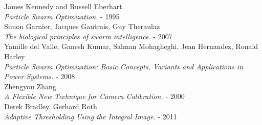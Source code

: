\documentclass[journal]{IEEEtran}
\begin{document}

\begin{thebibliography}{1}

  James Kennedy and Russell Eberhart. \\
  \textit{Particle Swarm Optimization.} - 1995
\\
  Simon Garnier, Jacques Gautrais, Guy Theraulaz\\
  \textit{The biological principles of swarm intelligence.} - 2007
\\
  Yamille del Valle, Ganesh Kumar, Salman Mohagheghi, Jean Hernandez, Ronald Harley\\
  \textit{Particle Swarm Optimization: Basic Concepts, Variants and Applications in Power Systems.} - 2008
\\
  Zhengyou Zhang \\
  \textit{A Flexible New Technique for Camera Calibration.} - 2000
\\
  Derek Bradley, Gerhard Roth \\
  \textit{Adaptive Thresholding Using the Integral Image.} - 2011

\end{thebibliography}
\end{document}
